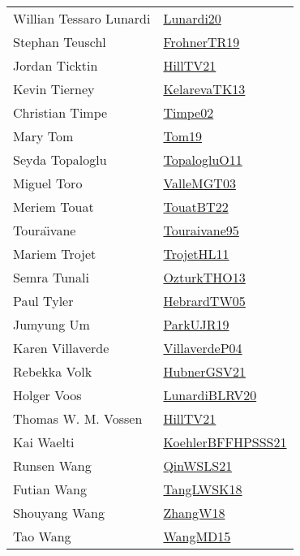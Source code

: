 {\begin{longtable}{p{4cm}p{20cm}}
Willian Tessaro Lunardi & \href{}{Lunardi20}\cite{Lunardi20} \\
Stephan Teuschl & \href{papers/FrohnerTR19.pdf}{FrohnerTR19}\cite{FrohnerTR19} \\
Jordan Ticktin & \href{papers/HillTV21.pdf}{HillTV21}\cite{HillTV21} \\
Kevin Tierney & \href{papers/KelarevaTK13.pdf}{KelarevaTK13}\cite{KelarevaTK13} \\
Christian Timpe & \href{articles/Timpe02.pdf}{Timpe02}\cite{Timpe02} \\
Mary Tom & \href{papers/Tom19.pdf}{Tom19}\cite{Tom19} \\
Seyda Topaloglu & \href{articles/TopalogluO11.pdf}{TopalogluO11}\cite{TopalogluO11} \\
Miguel Toro & \href{papers/ValleMGT03.pdf}{ValleMGT03}\cite{ValleMGT03} \\
Meriem Touat & \href{papers/TouatBT22.pdf}{TouatBT22}\cite{TouatBT22} \\
Toura{\"{\i}}vane & \href{papers/Touraivane95.pdf}{Touraivane95}\cite{Touraivane95} \\
Mariem Trojet & \href{articles/TrojetHL11.pdf}{TrojetHL11}\cite{TrojetHL11} \\
Semra Tunali & \href{articles/OzturkTHO13.pdf}{OzturkTHO13}\cite{OzturkTHO13} \\
Paul Tyler & \href{papers/HebrardTW05.pdf}{HebrardTW05}\cite{HebrardTW05} \\
Jumyung Um & \href{papers/ParkUJR19.pdf}{ParkUJR19}\cite{ParkUJR19} \\
Karen Villaverde & \href{papers/VillaverdeP04.pdf}{VillaverdeP04}\cite{VillaverdeP04} \\
Rebekka Volk & \href{articles/HubnerGSV21.pdf}{HubnerGSV21}\cite{HubnerGSV21} \\
Holger Voos & \href{articles/LunardiBLRV20.pdf}{LunardiBLRV20}\cite{LunardiBLRV20} \\
Thomas W. M. Vossen & \href{papers/HillTV21.pdf}{HillTV21}\cite{HillTV21} \\
Kai Waelti & \href{articles/KoehlerBFFHPSSS21.pdf}{KoehlerBFFHPSSS21}\cite{KoehlerBFFHPSSS21} \\
Runsen Wang & \href{articles/QinWSLS21.pdf}{QinWSLS21}\cite{QinWSLS21} \\
Futian Wang & \href{articles/TangLWSK18.pdf}{TangLWSK18}\cite{TangLWSK18} \\
Shouyang Wang & \href{articles/ZhangW18.pdf}{ZhangW18}\cite{ZhangW18} \\
Tao Wang & \href{articles/WangMD15.pdf}{WangMD15}\cite{WangMD15} \\

\end{longtable}}
